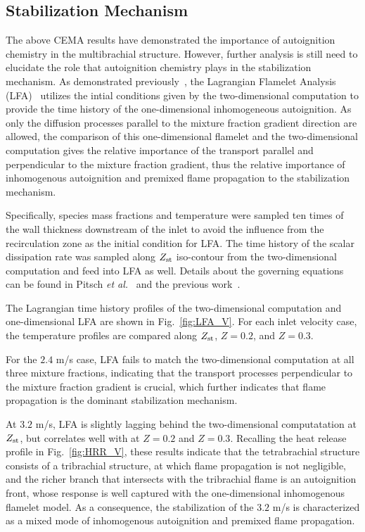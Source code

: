 \documentclass{wssci}
\begin{document}
\subsection{Stabilization Mechanism} 
The above CEMA results have demonstrated the importance of autoignition chemistry in the multibrachial structure.  However, further analysis is still need to elucidate the role that autoignition chemistry plays in the stabilization mechanism.  As demonstrated previously~\cite{deng15}, the Lagrangian Flamelet Analysis (LFA)~\cite{pitsch98a} utilizes the intial conditions given by the two-dimensional computation to provide the time history of the one-dimensional inhomogeneous autoignition.  As only the diffusion processes parallel to the mixture fraction gradient direction are allowed, the comparison of this one-dimensional flamelet and the two-dimensional computation gives the relative importance of the transport parallel and perpendicular to the mixture fraction gradient, thus the relative importance of inhomogenous autoignition and premixed flame propagation to the stabilization mechanism.

Specifically, species mass fractions and temperature were sampled ten times of the wall thickness downstream of the inlet to avoid the influence from the recirculation zone as the initial condition for LFA.  The time history of the scalar dissipation rate was sampled along $Z_{\rm st}$ iso-contour from the two-dimensional computation and feed into LFA as well.  Details about the governing equations can be found in Pitsch \emph{et al.}~\cite{pitsch98a} and the previous work~\cite{deng15}.

The Lagrangian time history profiles of the two-dimensional computation and one-dimensional LFA are shown in Fig.~\ref{fig:LFA_V}.  For each inlet velocity case, the temperature profiles are compared along $Z_{\rm st}$, $Z = 0.2$, and $Z = 0.3$.  

For the $2.4$ m/s case, LFA fails to match the two-dimensional computation at all three mixture fractions, indicating that the transport processes perpendicular to the mixture fraction gradient is crucial, which further indicates that flame propagation is the dominant stabilization mechanism.

At $3.2$ m/s, LFA is slightly lagging behind the two-dimensional computatation at $Z_{\rm st}$, but correlates well with at $Z = 0.2$ and $Z = 0.3$.  Recalling the heat release profile in Fig.~\ref{fig:HRR_V}, these results indicate that the tetrabrachial structure consists of a tribrachial structure, at which flame propagation is not negligible, and the richer branch that intersects with the tribrachial flame is an autoignition front, whose response is well captured with the one-dimensional inhomogenous flamelet model.  As a consequence, the stabilization of the $3.2$ m/s is characterized as a mixed mode of inhomogenous autoignition and premixed flame propagation.
\end{document}
